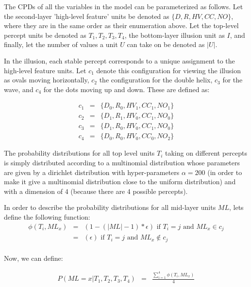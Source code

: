 \documentclass{article} %
\begin{document}
The CPDs of all the variables in the model can be parameterized as follows. Let the second-layer 'high-level feature' units be denoted as $\{D, R, HV, CC, NO\}$, where they are in the same order as their enumeration above. Let the top-level percept units be denoted as $T_1, T_2, T_3, T_4$, the bottom-layer illusion unit as $I$, and finally, let the number of values a unit $U$ can take on be denoted as $|U|$.  

In the illusion, each stable percept corresponds to a unique assignment to the high-level feature units. Let $c_1$ denote this configuration for viewing the illusion as ovals moving horizontally, $c_2$ the configuration for the double helix, $c_3$ for the wave, and $c_4$ for the dots moving up and down. These are defined as:

\begin{eqnarray*}
c_1 &=& \{D_0,R_0,HV_1,CC_1,NO_1 \} \\
c_2 &=& \{D_1,R_1,HV_0,CC_1,NO_0 \} \\
c_3 &=& \{D_1,R_0,HV_0,CC_1,NO_0 \} \\
c_4 &=& \{D_0,R_0,HV_0,CC_0,NO_2 \} 
\end{eqnarray*}

The probability distributions for all top level units $T_i$ taking on different percepts is simply distributed according to a multinomial distribution whose parameters are given by a dirichlet distribution with hyper-parameters $\alpha = 200$ (in order to make it give a multinomial distribution close to the uniform distribution) and with a dimension of 4 (because there are 4 possible percepts).

In order to describe the probability distributions for all mid-layer units $ML$, lets define the following function:
\begin{eqnarray*}
\phi(T_i, ML_x) &=& (1-(|ML|-1)*\epsilon) \textrm{  if } T_i = j \textrm{ and } ML_x \in c_j \\
&=& (\epsilon) \textrm{  if } T_i = j \textrm{ and } ML_x \notin c_j \\
\end{eqnarray*}

Now, we can define:

\begin{eqnarray*}
P(ML = x|T_1,T_2,T_3,T_4) &=& \frac{\sum_{i=1}^4 \phi(T_i, ML_x)}{4} \\
\end{eqnarray*}
\end{document}
